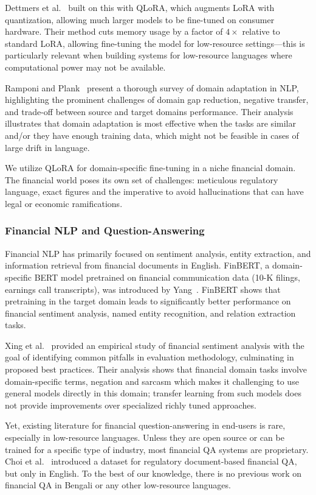 \documentclass{article}
\begin{document}
Dettmers et al.~\cite{Dettmers2023} built on this with QLoRA, which augments LoRA with
quantization, allowing much larger models to be fine-tuned on consumer hardware. Their
method cuts memory usage by a factor of $4\times$ relative to standard LoRA, allowing
fine-tuning the model for low-resource settings---this is particularly relevant when
building systems for low-resource languages where computational power may not be
available.

Ramponi and Plank~\cite{ramponi2020} present a thorough survey of domain adaptation in
NLP, highlighting the prominent challenges of domain gap reduction, negative transfer,
and trade-off between source and target domains performance. Their analysis illustrates
that domain adaptation is most effective when the tasks are similar and/or they have
enough training data, which might not be feasible in cases of large drift in language.

We utilize QLoRA for domain-specific fine-tuning in a niche financial domain. The
financial world poses its own set of challenges: meticulous regulatory language, exact
figures and the imperative to avoid hallucinations that can have legal or economic
ramifications.

\subsubsection{Financial NLP and Question-Answering}

Financial NLP has primarily focused on sentiment analysis, entity extraction, and
information retrieval from financial documents in English. FinBERT, a domain-specific
BERT model pretrained on financial communication data (10-K filings, earnings call
transcripts), was introduced by Yang~\cite{yang2020finbert}. FinBERT shows that
pretraining in the target domain leads to significantly better performance on financial
sentiment analysis, named entity recognition, and relation extraction tasks.

Xing et al.~\cite{xing2020} provided an empirical study of financial sentiment analysis
with the goal of identifying common pitfalls in evaluation methodology, culminating in
proposed best practices. Their analysis shows that financial domain tasks involve
domain-specific terms, negation and sarcasm which makes it challenging to use general
models directly in this domain; transfer learning from such models does not provide
improvements over specialized richly tuned approaches.

Yet, existing literature for financial question-answering in end-users is rare,
especially in low-resource languages. Unless they are open source or can be trained for
a specific type of industry, most financial QA systems are proprietary. Choi et
al.~\cite{choi2025} introduced a dataset for regulatory document-based financial QA,
but only in English. To the best of our knowledge, there is no previous work on
financial QA in Bengali or any other low-resource languages.
\end{document}
